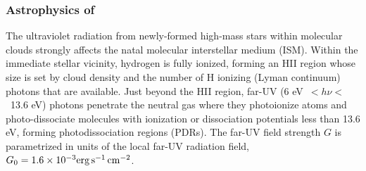 \parskip0pt



%
\subsubsection{Astrophysics of \cii}

The ultraviolet radiation from newly-formed high-mass stars within
molecular clouds strongly affects the natal molecular interstellar
medium (ISM).  Within the immediate stellar vicinity, hydrogen is
fully ionized, forming an H{\small II} region whose size is set by
cloud density and the number of H ionizing (Lyman continuum) photons
that are available. Just beyond the H{\small II} region, far-UV (6
eV~$< h\nu <$~13.6 eV) photons penetrate the neutral gas where they
photoionize atoms and photo-dissociate molecules with ionization or
dissociation potentials less than 13.6 eV, forming photodissociation
regions (PDRs). The far-UV field strength $G$ is parametrized in
units of the local far-UV radiation field, $G_0=1.6 \times 10^{-3}\rm
erg\, s^{-1}\,cm^{-2}$.


